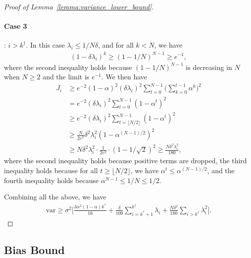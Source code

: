 \documentclass[11pt]{article}
\begin{document}
\begin{proof}[Proof of Lemma~\ref{lemma:variance_lower_bound}]
\paragraph{Case 3}: $i>k^\dagger$. In this case $\lambda_i\le1/N\delta$, and for all $k<N$, we have
\begin{align*}
(1-\delta\lambda_i)^k\ge(1-1/N)^{N-1}\ge e^{-1},
\end{align*}
where the second inequality holds because $(1-1/N)^{N-1}$ is decreasing in $N$ when $N\ge2$ and the limit is $e^{-1}$. We then have
\begin{align*}
J_i&\ge e^{-2}(1-\alpha)^2(\delta\lambda_i)^2\sum_{t=0}^{N-1}\bigg(\sum_{k=0}^{t-1}\alpha^k\bigg)^2\\
&=e^{-2}(\delta\lambda_i)^2\sum_{t=0}^{N-1}(1-\alpha^t)^2\\
&\ge e^{-2}(\delta\lambda_i)^2\sum_{t=\lfloor N/2\rfloor}^{N-1}(1-\alpha^t)^2\\
&\ge\frac{N}{2e^2}\delta^2\lambda_i^2(1-\alpha^{(N-1)/2})^2\\
&\ge N\delta^2\lambda_i^2\cdot\frac1{2e^2}\cdot(1-1/\sqrt 2)^2\ge\frac{N\delta^2\lambda_i^2}{180},
\end{align*}
where the second inequality holds because positive terms are dropped, the third inequality holds because for all $t\ge\lfloor N/2\rfloor$, we have $\alpha^t\le\alpha^{(N-1)/2}$, and the fourth inequality holds because $\alpha^{N-1}\le1/N\le1/2$.

Combining all the above, we have
\begin{align*}
\mathrm{var}\ge\sigma^2\bigg[\frac{3\alpha^2(1-\alpha)k^*}{16}+\frac{\delta}{100}\sum_{i=k^*+1}^{k^\dagger}\lambda_i+\frac{N\delta^2}{180}\sum_{i>k^\dagger}\lambda_i^2\bigg].
\end{align*}
\end{proof}

\subsection{Bias Bound}\label{subsection:bias}
\end{document}
